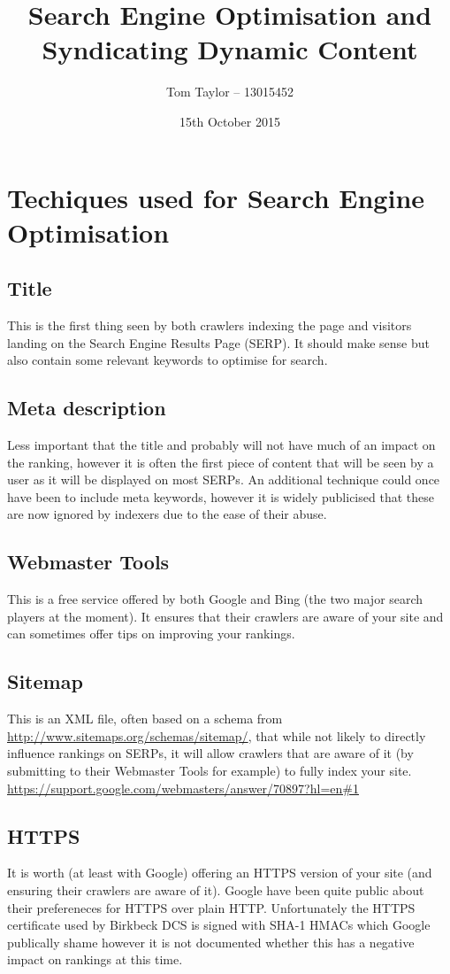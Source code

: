 \documentclass[a4paper,11pt]{article}
\title{Search Engine Optimisation and Syndicating Dynamic Content}
\author{Tom Taylor -- 13015452}
\date{15th October 2015}
\begin{document}
\maketitle
\section{Techiques used for Search Engine Optimisation}
\subsection{Title}
This is the first thing seen by both crawlers indexing the page and visitors landing on the Search Engine Results Page (SERP). It should make sense but also contain some relevant keywords to optimise for search.

\subsection{Meta description}
Less important that the title and probably will not have much of an impact on the ranking, however it is often the first piece of content that will be seen by a user as it will be displayed on most SERPs.  An additional technique could once have been to include meta keywords, however it is widely publicised that these are now ignored by indexers due to the ease of their abuse.

\subsection{Webmaster Tools}
This is a free service offered by both Google and Bing (the two major search players at the moment).  It ensures that their crawlers are aware of your site and can sometimes offer tips on improving your rankings.

\subsection{Sitemap}
This is an XML file, often based on a schema from \url{http://www.sitemaps.org/schemas/sitemap/}, that while not likely to directly influence rankings on SERPs, it will allow crawlers that are aware of it (by submitting to their Webmaster Tools for example) to fully index your site.\\\url{https://support.google.com/webmasters/answer/70897?hl=en#1}

\subsection{HTTPS}
It is worth (at least with Google) offering an HTTPS version of your site (and ensuring their crawlers are aware of it).  Google have been quite public about their prefereneces for HTTPS over plain HTTP.  Unfortunately the HTTPS certificate used by Birkbeck DCS is signed with SHA-1 HMACs which Google publically shame however it is not documented whether this has a negative impact on rankings at this time.
\end{document}
